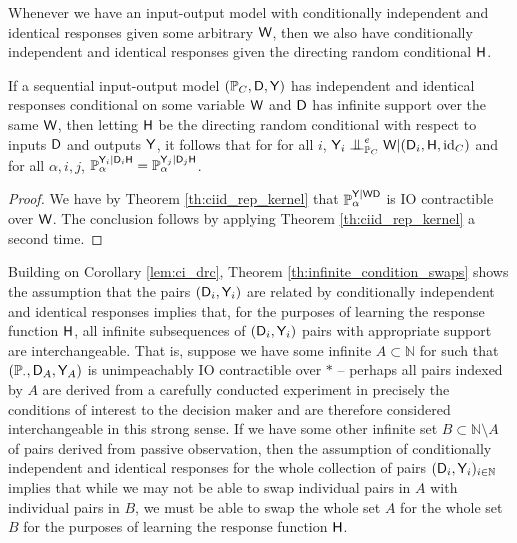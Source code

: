 Whenever we have an input-output model with conditionally independent and identical responses given some arbitrary $\mathsf{W}$, then we also have conditionally independent and identical responses given the directing random conditional $\mathsf{H}$.

\begin{corollary}\label{lem:ci_drc}
If a sequential input-output model $(\mathbb{P}_C,\mathsf{D},\mathsf{Y})$ has independent and identical responses conditional on some variable $\mathsf{W}$ and $\mathsf{D}$ has infinite support over the same $\mathsf{W}$, then letting $\mathsf{H}$ be the directing random conditional with respect to inputs $\mathsf{D}$ and outputs $\mathsf{Y}$, it follows that for for all $i$, $\RV{Y}_i\CI^e_{\prob{P}_C} \RV{W}|(\RV{D}_i,\RV{H},\text{id}_C)$ and for all $\alpha, i, j$, $\mathbb{P}_\alpha^{\mathsf{Y}_i|\mathsf{D}_i\mathsf{H}}=\mathbb{P}_\alpha^{\mathsf{Y}_j|\mathsf{D}_j\mathsf{H}}$.
\end{corollary}

\begin{proof}
We have by Theorem \ref{th:ciid_rep_kernel} that $\mathbb{P}_\alpha^{\mathsf{Y}|\mathsf{W}\mathsf{D}}$ is IO contractible over $\mathsf{W}$. The conclusion follows by applying Theorem \ref{th:ciid_rep_kernel} a second time.
\end{proof}

Building on Corollary \ref{lem:ci_drc}, Theorem \ref{th:infinite_condition_swaps} shows the assumption that the pairs $(\mathsf{D}_i,\mathsf{Y}_i)$ are related by conditionally independent and identical responses implies that, for the purposes of learning the response function $\mathsf{H}$, all infinite subsequences of $(\mathsf{D}_i,\mathsf{Y}_i)$ pairs with appropriate support are interchangeable. That is, suppose we have some infinite $A\subset \mathbb{N}$ for such that $(\mathbb{P}_\cdot,\mathsf{D}_A,\mathsf{Y}_A)$ is unimpeachably IO contractible over $*$ -- perhaps all pairs indexed by $A$ are derived from a carefully conducted experiment in precisely the conditions of interest to the decision maker and are therefore considered interchangeable in this strong sense. If we have some other infinite set $B\subset \mathbb{N}\setminus A$ of pairs derived from passive observation, then the assumption of conditionally independent and identical responses for the whole collection of pairs $(\mathsf{D}_i,\mathsf{Y}_i)_{i\in\mathbb{N}}$ implies that while we may not be able to swap individual pairs in $A$ with individual pairs in $B$, we must be able to swap the whole set $A$ for the whole set $B$ for the purposes of learning the response function $\mathsf{H}$.

